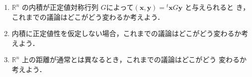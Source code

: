 \documentclass[11pt, uplatex, dvipdfmx, titlepage]{jsarticle}
\theoremstyle{definition}
\begin{document}
\begin{enumerate}

\item $\mathbb{R}^n$ の内積が正定値対称行列
  $G$によって$(\bm{x}, \bm{y}) = {}^{t} \bm{x} G \bm{y}$ と与えられると
  き，これまでの議論はどこがどう変わるか考えよう．

\item 内積に正定値性を仮定しない場合，これまでの議論はどこがどう変わるか考えよう．
  
\item $\mathbb{R}^n$ 上の距離が通常とは異なるとき，これまでの議論はどこがどう
  変わるか考えよう．

\end{enumerate}
\end{document}
